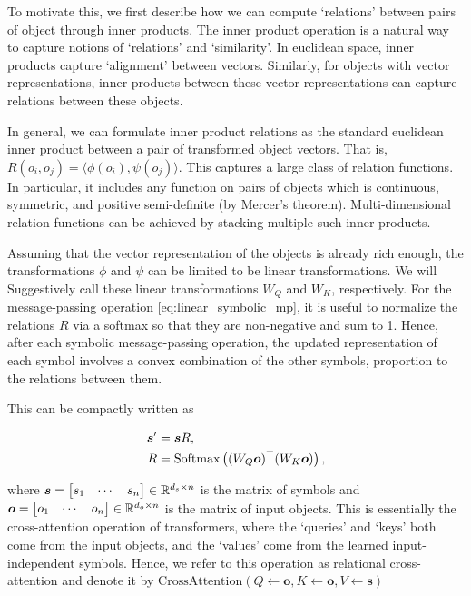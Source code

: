 To motivate this, we first describe how we can compute `relations' between pairs of object through inner products. The inner product operation is a natural way to capture notions of `relations' and `similarity'. In euclidean space, inner products capture `alignment' between vectors. Similarly, for objects with vector representations, inner products between these vector representations can capture relations between these objects.

In general, we can formulate inner product relations as the standard euclidean inner product between a pair of transformed object vectors. That is, $R(o_i, o_j) = \langle \phi(o_i), \psi(o_j) \rangle$. This captures a large class of relation functions. In particular, it includes any function on pairs of objects which is continuous, symmetric, and positive semi-definite (by Mercer's theorem). Multi-dimensional relation functions can be achieved by stacking multiple such inner products.

Assuming that the vector representation of the objects is already rich enough, the transformations $\phi$ and $\psi$ can be limited to be linear transformations. We will Suggestively call these linear transformations $W_Q$ and $W_K$, respectively. For the message-passing operation \cref{eq:linear_symbolic_mp}, it is useful to normalize the relations $R$ via a softmax so that they are non-negative and sum to 1. Hence, after each symbolic message-passing operation, the updated representation of each symbol involves a convex combination of the other symbols, proportion to the relations between them.

This can be compactly written as

\begin{equation}
    \label{eq:relational_crossattention}
    \begin{split}
        \boldsymbol{s}' &= \boldsymbol{s} R, \\
        R &= \text{Softmax}\left((W_Q \boldsymbol{o})^\top (W_K \boldsymbol{o})\right),
    \end{split}
\end{equation}

\noindent where $\boldsymbol{s} = \begin{bmatrix}s_1 & \cdots & s_n \end{bmatrix} \in \mathbb{R}^{d_s \times n}$ is the matrix of symbols and $\boldsymbol{o} = \begin{bmatrix}o_1 & \cdots & o_n \end{bmatrix} \in \mathbb{R}^{d_o \times n}$ is the matrix of input objects. This is essentially the cross-attention operation of transformers, where the `queries' and `keys' both come from the input objects, and the `values' come from the learned input-independent symbols. Hence, we refer to this operation as relational cross-attention and denote it by $\text{CrossAttention}(Q \gets \boldsymbol{o}, K \gets \boldsymbol{o}, V \gets \boldsymbol{s})$

